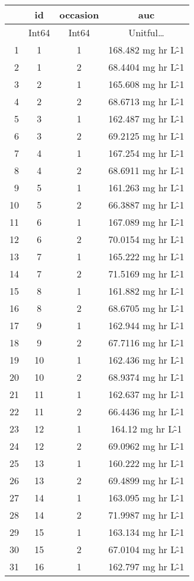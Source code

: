 \documentclass[12pt,a4paper]{article}
\begin{document}
\begin{tabular}{r|ccc}
	& id & occasion & auc\\
	\hline
	& Int64 & Int64 & Unitful…\\
	\hline
	1 & 1 & 1 & 168.482 mg hr L\^-1 \\
	2 & 1 & 2 & 68.4404 mg hr L\^-1 \\
	3 & 2 & 1 & 165.608 mg hr L\^-1 \\
	4 & 2 & 2 & 68.6713 mg hr L\^-1 \\
	5 & 3 & 1 & 162.487 mg hr L\^-1 \\
	6 & 3 & 2 & 69.2125 mg hr L\^-1 \\
	7 & 4 & 1 & 167.254 mg hr L\^-1 \\
	8 & 4 & 2 & 68.6911 mg hr L\^-1 \\
	9 & 5 & 1 & 161.263 mg hr L\^-1 \\
	10 & 5 & 2 & 66.3887 mg hr L\^-1 \\
	11 & 6 & 1 & 167.089 mg hr L\^-1 \\
	12 & 6 & 2 & 70.0154 mg hr L\^-1 \\
	13 & 7 & 1 & 165.222 mg hr L\^-1 \\
	14 & 7 & 2 & 71.5169 mg hr L\^-1 \\
	15 & 8 & 1 & 161.882 mg hr L\^-1 \\
	16 & 8 & 2 & 68.6705 mg hr L\^-1 \\
	17 & 9 & 1 & 162.944 mg hr L\^-1 \\
	18 & 9 & 2 & 67.7116 mg hr L\^-1 \\
	19 & 10 & 1 & 162.436 mg hr L\^-1 \\
	20 & 10 & 2 & 68.9374 mg hr L\^-1 \\
	21 & 11 & 1 & 162.637 mg hr L\^-1 \\
	22 & 11 & 2 & 66.4436 mg hr L\^-1 \\
	23 & 12 & 1 & 164.12 mg hr L\^-1 \\
	24 & 12 & 2 & 69.0962 mg hr L\^-1 \\
	25 & 13 & 1 & 160.222 mg hr L\^-1 \\
	26 & 13 & 2 & 69.4899 mg hr L\^-1 \\
	27 & 14 & 1 & 163.095 mg hr L\^-1 \\
	28 & 14 & 2 & 71.9987 mg hr L\^-1 \\
	29 & 15 & 1 & 163.134 mg hr L\^-1 \\
	30 & 15 & 2 & 67.0104 mg hr L\^-1 \\
	31 & 16 & 1 & 162.797 mg hr L\^-1 \\

\end{tabular}
\end{document}
